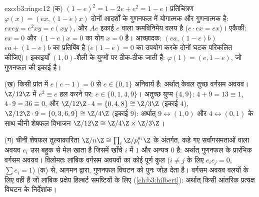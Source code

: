 \begin{solution}{exo:b3:rings:12}
(क) $(1-e)^2 = 1 - 2e + e^2 = 1 - e$। प्रतिचित्रण $\varphi(x) =
(ex, (1-e)x)$ दोनों आदर्शों के गुणनफल में योगात्मक
और गुणनात्मक है: $exey = e^2xy = e(xy)$, और $Ae$ इकाई $e$ वाला क्रमविनिमेय वलय
है ($e\cdot ex = ex$)। एकैकी: $ex = 0$ और $(1-e)x = 0$ का योग $x = 0$ है। आच्छादक: $(ea,
(1-e)b)$
$ea + (1-e)b$ का प्रतिबिंब है ($e(1-e) = 0$ का उपयोग करके दोनों घटक परिकलित कीजिए)।
इकाइयाँ $(1, 0)$-शैली के युग्मों पर ठीक-ठीक जाती हैं: $\varphi(1) = (e, 1-e)$, जो गुणनफल
की इकाई है।

(ख) किसी प्रांत में $e(e - 1) = 0$ से $e \in \{0, 1\}$ अनिवार्य है: अर्थात् केवल तुच्छ
वर्गसम अवयव। $\Z/12\Z$ में $e^2 \equiv e$ हल करने पर: $e
\in \{0, 1, 4, 9\}$। अतुच्छ युग्म $\{4, 9\}$:
$4 + 9 =
13 \equiv 1$, $4\cdot9 = 36 \equiv 0$, और $\Z/12\Z\cdot4 =
\{0, 4, 8\} \cong \Z/3\Z$ (इकाई $4$), $\Z/12\Z\cdot9 = \{0,
3, 6, 9\} \cong \Z/4\Z$ (इकाई $9$): अर्थात्
$9 \leftrightarrow
(1, 0)$ और $4 \leftrightarrow (0, 1)$ के साथ चीनी शेषफल विभाजन $\Z/12\Z \cong \Z/4\Z\times\Z/3\Z$।

(ग) चीनी शेषफल तुल्याकारिता $\Z/n\Z \cong \prod_i
\Z/p_i^{a_i}\Z$ के अंतर्गत, कहे गए सर्वांगसमताओं
वाला अवयव $e_i$ उस बहुक से मेल खाता है जिसमें खाँचे $i$ में $1$
और अन्यत्र $0$ है: अर्थात् गुणनफल के प्रारंभिक वर्गसम अवयव।
विलोमतः लांबिक वर्गसम अवयवों का कोई पूर्ण कुल ($i \neq j$ के लिए $e_ie_j = 0$,
$\sum e_i = 1$) (क) से, आगमन द्वारा, गुणनफल विघटन को पुनः जोड़ देता है।
वर्गसम अवयव वलयों के लिए वही हैं जो लांबिक प्रक्षेप हिल्बर्ट
समष्टियों के लिए (\cref{ch:b3:hilbert}): अर्थात् किसी आंतरिक प्रत्यक्ष विघटन के
निर्देशांक।
\end{solution}

